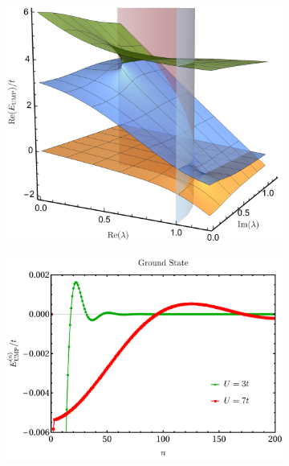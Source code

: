 \documentclass[aps,prb,reprint,noshowkeys,linenumbers,superscriptaddress]{revtex4-1}
\begin{document}
\begin{figure}
	\begin{subfigure}{0.32\textwidth}
	\includegraphics[height=0.75\textwidth]{fig3a}	
    \end{subfigure}
    \begin{subfigure}{0.32\textwidth}
	\includegraphics[height=0.75\textwidth]{fig3b}
		\subcaption{\label{subfig:UMP_cvg}}
    \end{subfigure}
    \begin{subfigure}{0.32\textwidth}

\end{subfigure}
\end{figure}
\end{document}
